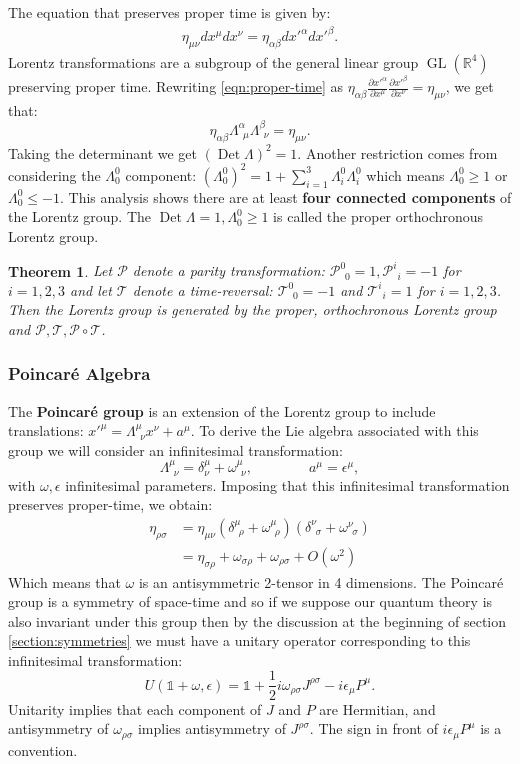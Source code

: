 \documentclass[10pt]{article}
\newcommand{\iden}{\mathds{1}}
\newcommand{\bR}{\mathbb{R}}
\newcommand{\ms}{\mathscr}
\newcommand{\sg}{\sigma}
\newcommand{\FR}[2]{\frac{#1}{#2}}
\newcommand{\PP}[2]{\frac{\partial #1}{\partial #2}}
\theoremstyle{plain}
\newtheorem{theorem}{Theorem}[section]
\theoremstyle{definition}
\theoremstyle{remark}
\DeclareMathOperator{\GL}{GL}
\DeclareMathOperator{\Det}{Det}
\newcommand{\om}{\omega}
\begin{document}
The equation that preserves proper time is given by:
\begin{align} 
\eta_{\mu\nu}dx^\mu dx^\nu = \eta_{\alpha\beta}dx'^\alpha dx'^\beta.
\label{eqn:proper-time}
\end{align}
Lorentz transformations are a subgroup of the general linear group
\(\GL(\bR^4)\) preserving proper time. Rewriting \eqref{eqn:proper-time} as
\(\eta_{\alpha\beta}\PP{x'^\alpha}{x^\mu} \PP{x'^\beta}{x^\nu} =
\eta_{\mu\nu}\), we get that:
\[ \eta_{\alpha\beta}\Lambda^\alpha_{\ \ \mu}\Lambda^\beta_{\ \ \nu} =
\eta_{\mu\nu}.\]
Taking the determinant we get \((\Det\Lambda)^2=1\). Another restriction
comes from considering the \(\Lambda^0_0\) component: \((\Lambda^0_0)^2 = 1
+ \sum_{i=1}^3\Lambda^0_i\Lambda^0_i\) which means \(\Lambda^0_0 \ge 1\) or
\(\Lambda^0_0 \le -1\). This analysis shows there are at least \textbf{four
connected components} of the Lorentz group. The $\Det\Lambda=1,
\Lambda^0_0\ge 1$ is called the proper orthochronous Lorentz group.  
\begin{theorem} Let $\ms P$ denote a parity transformation: $\ms P^0_{\ \
0} = 1, \ms P^i_{\ \ i} = -1$ for $i=1,2,3$ and let $\ms T$ denote a
time-reversal: $\ms T^0_{\ \ 0} = -1$ and $\ms T^i_{\ \ i} = 1$ for
$i=1,2,3$. Then the Lorentz group is generated by the proper, orthochronous
Lorentz group and $\ms P, \ms T, \ms P\circ\ms T$.
\end{theorem}
\subsubsection{Poincar\'e Algebra}
The \textbf{Poincar\'e group} is an extension of the Lorentz group to
include translations: $x'^\mu = \Lambda^\mu_{\ \ \nu} x^\nu + a^\mu$. To
derive the Lie algebra associated with this group we will consider an
infinitesimal transformation: \[\Lambda^\mu_{\ \ \nu} = \delta^\mu_\nu +
\omega^\mu_{\ \ \nu},\qquad\qquad a^\mu = \epsilon^\mu,\] with $\omega,
\epsilon$ infinitesimal parameters. Imposing that this infinitesimal
transformation preserves proper-time, we obtain:
\begin{align*}
    \eta_{\rho\sg} &= \eta_{\mu\nu}(\delta^\mu_{\ \
    \rho}+\om^\mu_{\ \ \rho})(\delta^\nu_{\ \ \sg}+\om^\nu_{\ \ \sg})\\
    &= \eta_{\sg\rho} + \om_{\sg\rho}+\om_{\rho\sg} + O(\om^2)
\end{align*}
Which means that $\om$ is an antisymmetric 2-tensor in 4 dimensions.
The Poincar\'e group is a symmetry of space-time and so if we suppose our
quantum theory is also invariant under this group then by the
discussion at the beginning of 
section \ref{section:symmetries} we must have a unitary operator corresponding to this infinitesimal
transformation: \[ U(\iden+\omega,\epsilon) = \iden + \FR{1}{2}i\om_{\rho\sg}
J^{\rho\sg} - i\epsilon_\mu P^\mu.\] Unitarity implies that each component
of $J$ and $P$ are Hermitian, and antisymmetry of $\om_{\rho\sg}$ implies
antisymmetry of $J^{\rho\sg}$. The sign in front of $i\epsilon_\mu P^\mu$
is a convention. %
\end{document}
